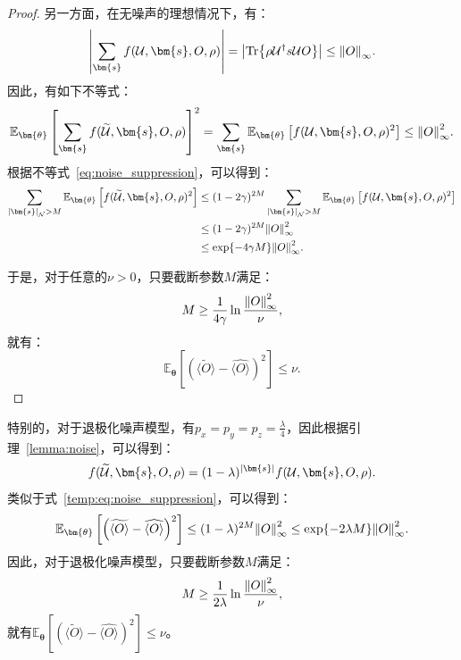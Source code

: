 \begin{proof}
    另一方面，在无噪声的理想情况下，有：
    \begin{equation}
        \abs{\sum_{\bm{s}}f(\mathcal{U},\bm{s},O,\rho)}=\abs{\Tr{\rho \mathcal{U}^\dagger s \mathcal{U} O}}\leq\norm{O}_\infty.
    \end{equation}
    因此，有如下不等式：
    \begin{equation}
        \mathbb{E}_{\bm{\theta}}\left[ \sum_{\bm{s}}f(\widetilde{\mathcal{U}},\bm{s},O,\rho)\right]^2=\sum_{\bm{s}}\mathbb{E}_{\bm{\theta}}\left[f(\mathcal{U},\bm{s},O,\rho)^2\right]\leq\norm{O}_\infty^2.
    \end{equation}
    根据不等式~\eqref{eq:noise_suppression}，可以得到：
    \begin{equation}\label{temp:eq:noise_suppression}
        \begin{aligned}
            \sum_{\abs{\bm{s}}_{\mathcal{N}}>M}\mathbb{E}_{\bm{\theta}}\left[f(\widetilde{\mathcal{U}},\bm{s},O,\rho)^2\right] &\leq (1-2\gamma)^{2M} \sum_{\abs{\bm{s}}_{\mathcal{N}}>M}\mathbb{E}_{\bm{\theta}}\left[f(\mathcal{U},\bm{s},O,\rho)^2\right]\\
            &\leq (1-2\gamma)^{2M} \norm{O}_\infty^2\\
            &\leq \exp{-4\gamma M} \norm{O}_\infty^2.
        \end{aligned}
    \end{equation}

    于是，对于任意的$\nu > 0$，只要截断参数$M$满足：
    \begin{equation}
        M\geq\frac{1}{4\gamma}\ln{\frac{\norm{O}_\infty^2}{\nu}},
    \end{equation}
    就有：
    \begin{equation}
        \mathbb{E}_{\bm{\theta}}\left[\left(\widetilde{\langle O\rangle}-\widehat{\langle O\rangle}\right)^2\right]\leq\nu.
    \end{equation}
\end{proof}
\begin{remark}
    特别的，对于退极化噪声模型，有$p_x=p_y=p_z=\frac{\lambda}{4}$，因此根据引理~\ref{lemma:noise}，可以得到：
    \begin{equation}
        f(\widetilde{\mathcal{U}},\bm{s},O,\rho)=(1-\lambda)^{\abs{\bm{s}}}f(\mathcal{U},\bm{s},O,\rho).
    \end{equation}
    类似于式~\eqref{temp:eq:noise_suppression}，可以得到：
    \begin{equation}
        \mathbb{E}_{\bm{\theta}}\left[\left(\widetilde{\langle O\rangle}-\widehat{\langle O\rangle}\right)^2\right] \leq (1-\lambda)^{2M} \norm{O}_\infty^2 \leq \exp{-2\lambda M} \norm{O}_\infty^2.
    \end{equation}
    因此，对于退极化噪声模型，只要截断参数$M$满足：
    \begin{equation}
        M\geq\frac{1}{2\lambda}\ln{\frac{\norm{O}_\infty^2}{\nu}},
    \end{equation}
    就有$\mathbb{E}_{\bm{\theta}}\left[\left(\widetilde{\langle O\rangle}-\widehat{\langle O\rangle}\right)^2\right]\leq\nu$。
\end{remark}

